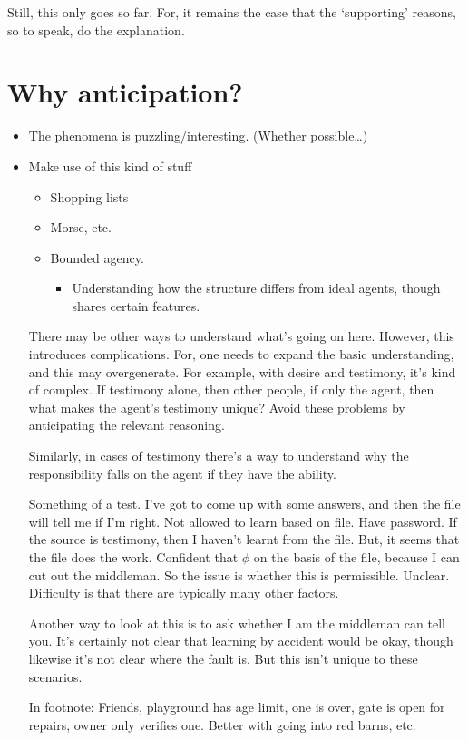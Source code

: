 \documentclass[10pt]{article}
\begin{document}
Still, this only goes so far.
For, it remains the case that the `supporting' reasons, so to speak, do the explanation.


\section{Why anticipation?}
\label{sec:why-anticipation}

\begin{itemize}
\item The phenomena is puzzling/interesting. (Whether possible\dots)
\item Make use of this kind of stuff
  \begin{itemize}
  \item Shopping lists
  \item Morse, etc.
  \item Bounded agency.
    \begin{itemize}
    \item Understanding how the structure differs from ideal agents, though shares certain features.
    \end{itemize}
  \end{itemize}
  There may be other ways to understand what's going on here.
  However, this introduces complications.
  For, one needs to expand the basic understanding, and this may overgenerate.
  For example, with desire and testimony, it's kind of complex.
  If testimony alone, then other people, if only the agent, then what makes the agent's testimony unique?
  Avoid these problems by anticipating the relevant reasoning.

  Similarly, in cases of testimony there's a way to understand why the responsibility falls on the agent if they have the ability.
  \begin{scenario}
    Something of a test.
    I've got to come up with some answers, and then the file will tell me if I'm right.
    Not allowed to learn based on file.
    Have password.
    If the source is testimony, then I haven't learnt from the file.
    But, it seems that the file does the work.
    Confident that \(\phi\) on the basis of the file, because I can cut out the middleman.
    So the issue is whether this is permissible.
    Unclear.
    Difficulty is that there are typically many other factors.

    Another way to look at this is to ask whether I am the middleman can tell you.
    It's certainly not clear that learning by accident would be okay, though likewise it's not clear where the fault is.
    But this isn't unique to these scenarios.

    In footnote:
    Friends, playground has age limit, one is over, gate is open for repairs, owner only verifies one.
    Better with going into red barns, etc.
  \end{scenario}
\end{itemize}
\end{document}

